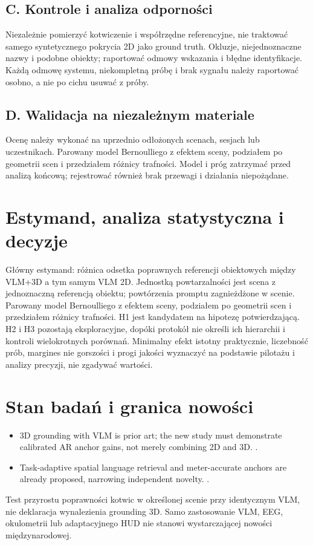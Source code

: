\documentclass[11pt,a4paper]{article}
\begin{document}
\subsection{C. Kontrole i analiza odporności}
Niezależnie pomierzyć kotwiczenie i współrzędne referencyjne, nie traktować samego syntetycznego pokrycia 2D jako ground truth. Okluzje, niejednoznaczne nazwy i podobne obiekty; raportować odmowy wskazania i błędne identyfikacje. Każdą odmowę systemu, niekompletną próbę i brak sygnału należy raportować osobno, a nie po cichu usuwać z próby.

\subsection{D. Walidacja na niezależnym materiale}
Ocenę należy wykonać na uprzednio odłożonych scenach, sesjach lub uczestnikach. Parowany model Bernoulliego z efektem sceny, podziałem po geometrii scen i przedziałem różnicy trafności. Model i próg zatrzymać przed analizą końcową; rejestrować również brak przewagi i działania niepożądane.

\section{Estymand, analiza statystyczna i decyzje}
Główny estymand: różnica odsetka poprawnych referencji obiektowych między VLM+3D a tym samym VLM 2D. Jednostką powtarzalności jest scena z jednoznaczną referencją obiektu; powtórzenia promptu zagnieżdżone w scenie. Parowany model Bernoulliego z efektem sceny, podziałem po geometrii scen i przedziałem różnicy trafności. H1 jest kandydatem na hipotezę potwierdzającą. H2 i H3 pozostają eksploracyjne, dopóki protokół nie określi ich hierarchii i kontroli wielokrotnych porównań. Minimalny efekt istotny praktycznie, liczebność prób, margines nie gorszości i progi jakości wyznaczyć na podstawie pilotażu i analizy precyzji, nie zgadywać wartości.

\section{Stan badań i granica nowości}
\begin{itemize}
\item 3D grounding with VLM is prior art; the new study must demonstrate calibrated AR anchor gains, not merely combining 2D and 3D. \cite{xrprior1}.
\item Task-adaptive spatial language retrieval and meter-accurate anchors are already proposed, narrowing independent novelty. \cite{xrprior2}.
\end{itemize}
Test przyrostu poprawności kotwic w określonej scenie przy identycznym VLM, nie deklaracja wynalezienia grounding 3D. Samo zastosowanie VLM, EEG, okulometrii lub adaptacyjnego HUD nie stanowi wystarczającej nowości międzynarodowej.
\end{document}
